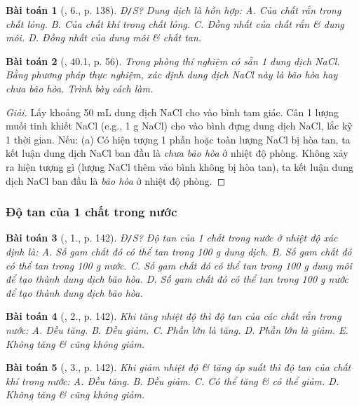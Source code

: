 \documentclass{article}
\newtheorem{baitoan}{Bài toán}
\begin{document}
\begin{baitoan}[\cite{SGK_Hoa_Hoc_8}, 6., p. 138]
	\emph{Đ\texttt{/}S?} Dung dịch là hỗn hợp: {\sf A.} Của chất rắn trong chất lỏng. {\sf B.} Của chất khí trong chất lỏng. {\sf C.} Đồng nhất của chất rắn \& dung môi. {\sf D.} Đồng nhất của dung môi \& chất tan.
\end{baitoan}

\begin{baitoan}[\cite{SBT_Hoa_Hoc_8}, 40.1, p. 56]
	Trong phòng thí nghiệm có sẵn 1 dung dịch \emph{NaCl}. Bằng phương pháp thực nghiệm, xác định dung dịch \emph{NaCl} này là bão hòa hay chưa bão hòa. Trình bày cách làm.
\end{baitoan}

\begin{proof}[Giải]
	Lấy khoảng 50 mL dung dịch NaCl cho vào bình tam giác. Cân 1 lượng muối tinh khiết NaCl (e.g., 1 g NaCl) cho vào bình đựng dung dịch NaCl, lắc kỹ 1 thời gian. Nếu: (a) Có hiện tượng 1 phần hoặc toàn lượng NaCl bị hòa tan, ta kết luận dung dịch NaCl ban đầu là \textit{chưa bão hòa} ở nhiệt độ phòng. Không xảy ra hiện tượng gì (lượng NaCl thêm vào bình không bị hòa tan), ta kết luận dung dịch NaCl ban đầu là \textit{bão hòa} ở nhiệt độ phòng.
\end{proof}

\subsubsection{Độ tan của 1 chất trong nước}

\begin{baitoan}[\cite{SGK_Hoa_Hoc_8}, 1., p. 142]
	\emph{Đ\texttt{/}S?} Độ tan của 1 chất trong nước ở nhiệt độ xác định là: {\sf A.} Số gam chất đó có thể tan trong \emph{100 g} dung dịch. {\sf B.} Số gam chất đó có thể tan trong \emph{100 g} nước. {\sf C.} Số gam chất đó có thể tan trong \emph{100 g} dung môi để tạo thành dung dịch bão hòa. {\sf D.} Số gam chất đó có thể tan trong \emph{100 g} nước để tạo thành dung dịch bão hòa.
\end{baitoan}

\begin{baitoan}[\cite{SGK_Hoa_Hoc_8}, 2., p. 142]
	Khi tăng nhiệt độ thì độ tan của các chất rắn trong nước: {\sf A.} Đều tăng. {\sf B.} Đều giảm. {\sf C.} Phần lớn là tăng. {\sf D.} Phần lớn là giảm. {\sf E.} Không tăng \& cũng không giảm.
\end{baitoan}

\begin{baitoan}[\cite{SGK_Hoa_Hoc_8}, 3., p. 142]
	Khi giảm nhiệt độ \& tăng áp suất thì độ tan của chất khí trong nước: {\sf A.} Đều tăng. {\sf B.} Đều giảm. {\sf C.} Có thể tăng \& có thể giảm. {\sf D.} Không tăng \& cũng không giảm.
\end{baitoan}
\end{document}
